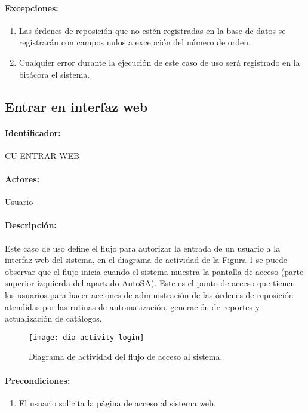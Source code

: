 \paragraph{Excepciones:}
\begin{enumerate}
  \item Las órdenes de reposición que no estén registradas en la base de datos se registrarán con campos nulos a excepción del número de orden.
  \item Cualquier error durante la ejecución de este caso de uso será registrado en la bitácora el sistema.
\end{enumerate}


\subsection{Entrar en interfaz web}\label{cu-entrar-web}
\paragraph{Identificador:}
CU-ENTRAR-WEB
\paragraph{Actores:}
Usuario
\paragraph{Descripción:}
Este caso de uso define el flujo para autorizar la entrada de un usuario a la interfaz web del sistema, en el diagrama de actividad de la Figura \ref{fig:dia-activity-login} se puede observar que el flujo inicia cuando el sistema muestra la pantalla de acceso (parte superior izquierda del apartado AutoSA). Este es el punto de acceso que tienen los usuarios para hacer acciones de administración de las órdenes de reposición atendidas por las rutinas de automatización, generación de reportes y actualización de catálogos.
\begin{figure}[h]
  \centering
  \texttt{[image: dia-activity-login]}
  \caption{Diagrama de actividad del flujo de acceso al sistema.}
  \label{fig:dia-activity-login}
\end{figure}
\paragraph{Precondiciones:}
\begin{enumerate}
  \item El usuario solicita la página de acceso al sistema web.
\end{enumerate}
